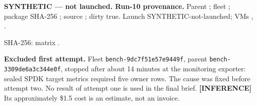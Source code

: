 \textbf{SYNTHETIC --- not launched. Run-10 provenance.} Parent ; fleet ; package SHA-256 ; source ; dirty true. Launch SYNTHETIC-not-launched; VMs , .

SHA-256: matrix .

\textbf{Excluded first attempt.} Fleet \texttt{bench-9dc7f51e57e9449f}, parent \texttt{bench-3309de6a3c344e0f}, stopped after about 14 minutes at the monitoring exporter: sealed SPDK target metrics required five owner rows. The cause was fixed before attempt two. No result of attempt one is used in the final brief. \textbf{[INFERENCE]} Its approximately \$1.5 cost is an estimate, not an invoice.
